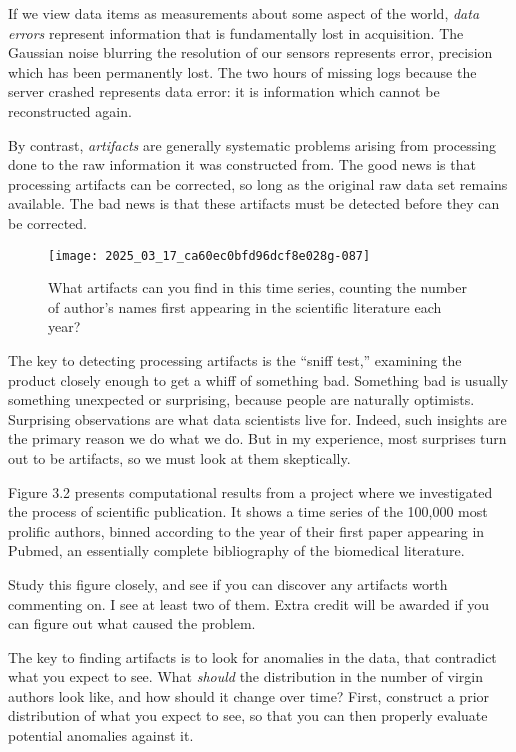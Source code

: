 \documentclass[10pt]{article}
\begin{document}
If we view data items as measurements about some aspect of the world, \textit{data errors} represent information that is fundamentally lost in acquisition. The Gaussian noise blurring the resolution of our sensors represents error, precision which has been permanently lost. The two hours of missing logs because the server crashed represents data error: it is information which cannot be reconstructed again.

By contrast, \textit{artifacts} are generally systematic problems arising from processing done to the raw information it was constructed from. The good news is that processing artifacts can be corrected, so long as the original raw data set remains available. The bad news is that these artifacts must be detected before they can be corrected.

\begin{figure}[htbp]
\centering
\texttt{[image: 2025\_03\_17\_ca60ec0bfd96dcf8e028g-087]}
\caption{What artifacts can you find in this time series, counting the number of author's names first appearing in the scientific literature each year?}
\end{figure}

The key to detecting processing artifacts is the ``sniff test,'' examining the product closely enough to get a whiff of something bad. Something bad is usually something unexpected or surprising, because people are naturally optimists. Surprising observations are what data scientists live for. Indeed, such insights are the primary reason we do what we do. But in my experience, most surprises turn out to be artifacts, so we must look at them skeptically.

Figure 3.2 presents computational results from a project where we investigated the process of scientific publication. It shows a time series of the 100,000 most prolific authors, binned according to the year of their first paper appearing in Pubmed, an essentially complete bibliography of the biomedical literature.

Study this figure closely, and see if you can discover any artifacts worth commenting on. I see at least two of them. Extra credit will be awarded if you can figure out what caused the problem.

The key to finding artifacts is to look for anomalies in the data, that contradict what you expect to see. What \textit{should} the distribution in the number of virgin authors look like, and how should it change over time? First, construct a prior distribution of what you expect to see, so that you can then properly evaluate potential anomalies against it.
\end{document}
